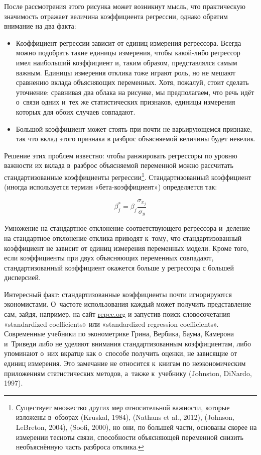 \documentclass[11pt]{article}
\begin{document}
После рассмотрения этого рисунка может возникнут мысль, что практическую значимость отражает величина коэффициента регрессии, однако обратим внимание на два факта:
\begin{itemize}
	\item Коэффициент регрессии зависит от единиц измерения регрессора.	Всегда можно подобрать такие единицы измерения, чтобы какой-либо регрессор имел наибольший коэффициент и, таким образом, представлялся самым важным. Единицы измерения отклика тоже играют роль, но не мешают сравнению вклада объясняющих переменных. Хотя, пожалуй, стоит сделать уточнение: сравнивая два облака на рисунке, мы предполагаем, что речь идёт о~связи одних и~тех же статистических признаков, единицы измерения которых для обоих случаев совпадают.
	\item Большой коэффициент может стоять при почти не варьирующемся признаке, так что вклад этого признака в разброс объясняемой величины будет невелик.
\end{itemize}

Решение этих проблем известно: чтобы ранжировать регрессоры по уровню важности их вклада в~разброс объясняемой переменной можно рассчитать стандартизованные коэффициенты регрессии\footnote{Существует множество других мер относительной важности, которые изложены в~обзорах (Kruskal, 1984), (Nathans et al., 2012), (Johnson, LeBreton,  2004), (Soofi, 2000), но они, по большей части, основаны скорее на измерении тесноты связи, способности объясняющей переменной снизить необъяснённую часть разброса отклика.}\fnnsp.
Стандартизованный коэффициент (иногда используется термин «бета-коэффициент») определяется так:

\[\beta_j^* = \beta_j\frac{\sigma_{x_j}}{\sigma_y} \]

Умножение на стандартное отклонение соответствующего регрессора и~деление на стандартное отклонение отклика приводят к~тому, что стандартизованный коэффициент не зависит от единиц измерения переменных модели. Кроме того, если коэффициенты при двух объясняющих переменных совпадают, стандартизованный коэффициент окажется больше у регрессора с большей дисперсией.

Интересный факт: стандартизованные коэффициенты почти игнорируются экономистами. О~частоте использования каждый может получить представление сам, зайдя, например, на сайт \url{repec.org} и запустив поиск словосочетания «standardized coefficients» или «standardized regression coefficients». Современные учебники по эконометрике Грина, Вербика, Баума, Камерона и~Триведи либо не уделяют внимания стандартизованным коэффициентам, либо упоминают о~них вкратце как о~способе получить оценки, не зависящие от единиц измерения. Это замечание не относится к~книгам по неэкономическим приложениям статистических методов, а~также к~учебнику (Johnston, DiNardo, 1997).
\end{document}
